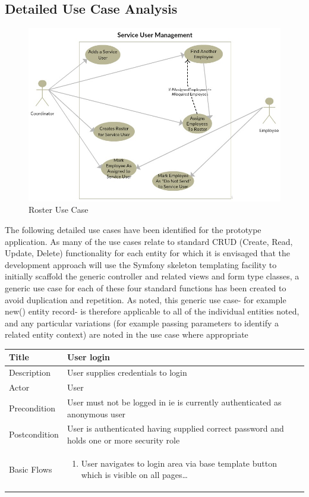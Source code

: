 \documentclass[a4paper,Times New Roman 11pt]{article}
\newcommand\addrow[2]{#1 &#2\\ }
\newcommand\addheading[2]{#1 &#2\\ \hline}
\newcommand\tabularhead{\begin{tabular}{lp{9cm}}
\hline
}
\newcommand\addmulrow[2]{ \begin{minipage}[t][][t]{3cm}#1\end{minipage}%
   &\begin{minipage}[t][][t]{9cm}
    \begin{enumerate} #2   \end{enumerate}
    \end{minipage}\\ }
\newenvironment{usecase}{\tabularhead}
{\hline\end{tabular}}
\begin{document}
\begin{samepage}
\subsection {Detailed Use Case Analysis}
 \begin{figure}[h!]
  \includegraphics[scale=0.65]{rosterusecase.jpg}
  \caption{Roster Use Case}
  \label{fig:roster use case}
\end{figure}
The following detailed use cases have been identified for the prototype application. As many of the use cases relate to standard CRUD (Create, Read, Update, Delete) functionality for each entity for which it is envisaged that the development approach will use the Symfony skeleton templating facility to initially scaffold the generic controller and related views and form type classes, a generic use case for each of these four standard functions has been created to avoid duplication and repetition. As noted, this generic use case- for example new() entity record- is therefore applicable to all of the individual entities noted, and any particular variations (for example passing parameters to identify a related entity context) are noted in the use case where appropriate
\newpage
\begin{usecase}
  \addheading{Title}{User login}
  \addheading{Description}{User supplies credentials to login}
  \addheading{Actor}{User} 
  \addrow{Precondition}{User must not be logged in ie is currently authenticated as anonymous user}
  \addrow{Postcondition}{User is authenticated having supplied correct password and holds one or more security role}
  \addmulrow{Basic Flows}{\item User navigates to login area via base template button which is visible on all pages\ldots
}
\end{usecase}
\end{samepage}
\end{document}
